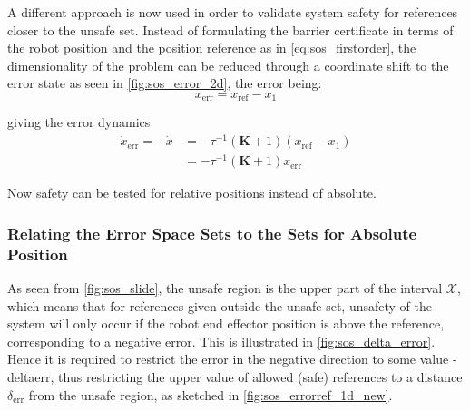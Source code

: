 A different approach is now used in order to validate system safety for references closer to the unsafe set. 
Instead of formulating the barrier certificate in terms of the robot position and the position reference as in \autoref{eq:sos_firstorder}, the dimensionality of the problem can be reduced  through a coordinate shift to the error state as seen in \autoref{fig:sos_error_2d}, the error being: %
\vspace{-3mm}
\begin{equation*}
x_\text{err}=x_\text{ref}-x_1
\end{equation*}

\vspace{-5mm}
giving the error dynamics
\vspace{-3mm}
\begin{align}
\dot{x}_\text{err} = -\dot{x} &= -\tau^{-1}(\mathbf{K}+1)(x_\text{ref}-x_1) \nonumber\\
&= -\tau^{-1}(\mathbf{K}+1)x_\text{err}
\end{align}

\vspace{-2mm}
Now safety can  be tested for relative positions instead of absolute.

\subsubsection{Relating the Error Space Sets to the Sets for Absolute Position}
 
\vspace{-2mm}
As seen from \autoref{fig:sos_slide}, the unsafe region is the upper part of the interval $\mathcal{X}$, which means that for references given outside the unsafe set, unsafety of the system will only occur if the robot end effector position is above the reference, corresponding to a negative error. This is illustrated in \autoref{fig:sos_delta_error}.
Hence it is required to restrict the error in the negative direction to some value -\gls{deltaerr}, thus restricting the upper value of allowed (safe) references to a distance $\delta_\text{err}$ from the unsafe region, as sketched in \autoref{fig:sos_errorref_1d_new}. %

